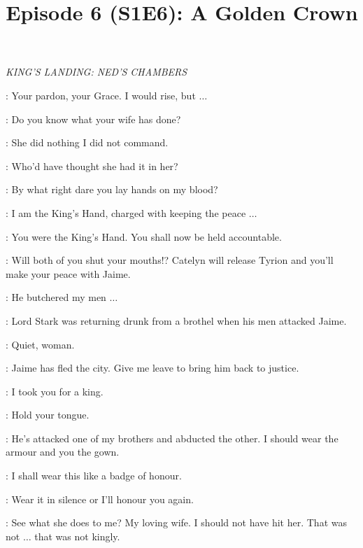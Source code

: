 

\title{Episode 6 (S1E6): A Golden Crown}
\author{}
\date{}
\maketitle




\scene

\textit{KING'S LANDING: NED'S CHAMBERS} 


\NED: Your pardon, your Grace. I would rise, but $\ldots$ 

\CERSEI: Do you know what your wife has done? 

\NED: She did nothing I did not command. 

\ROBERT: Who'd have thought she had it in her? 

\CERSEI: By what right dare you lay hands on my blood? 

\NED: I am the King's Hand, charged with keeping the peace $\ldots$ 

\CERSEI: You were the King's Hand. You shall now be held accountable. 

\ROBERT: Will both of you shut your mouths!? Catelyn will release Tyrion and you'll make your peace with Jaime. 

\NED: He butchered my men $\ldots$ 

\CERSEI: Lord Stark was returning drunk from a brothel when his men attacked Jaime. 

\ROBERT: Quiet, woman. 

\NED: Jaime has fled the city. Give me leave to bring him back to justice. 

\CERSEI: I took you for a king. 

\ROBERT: Hold your tongue. 

\CERSEI: He's attacked one of my brothers and abducted the other. I should wear the armour and you the gown. 


\CERSEI: I shall wear this like a badge of honour. 

\ROBERT: Wear it in silence or I'll honour you again. 


\ROBERT: See what she does to me? My loving wife. I should not have hit her. That was not $\ldots$ that was not kingly. 


